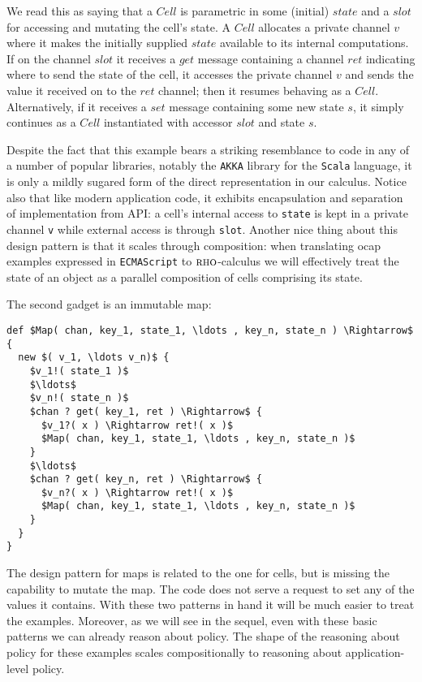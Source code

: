 \documentclass[]{acm_proc_article-sp}
\numberwithin{equation}{subsection}
\newcommand{\rhoc}{${\textsc{rho}}$-calculus}
\begin{document}
We read this as saying that a $Cell$ is parametric in some (initial)
$state$ and a $slot$ for accessing and mutating the cell's state. A
$Cell$ allocates a private channel $v$ where it makes the initially
supplied $state$ available to its internal computations. If on the
channel $slot$ it receives a $get$ message containing a channel $ret$
indicating where to send the state of the cell, it accesses the
private channel $v$ and sends the value it received on to the $ret$
channel; then it resumes behaving as a $Cell$. Alternatively, if it
receives a $set$ message containing some new state $s$, it simply
continues as a $Cell$ instantiated with accessor $slot$ and state $s$.

Despite the fact that this example bears a striking resemblance to code
in any of a number of popular libraries, notably the {\tt AKKA}
library for the {\tt Scala} language, it is only a mildly sugared
form of the direct representation in our calculus. Notice also that
like modern application code, it exhibits encapsulation and separation
of implementation from API: a cell's internal access to
{\tt state} is kept in a private channel {\tt v} while
external access is through {\tt slot}. Another nice thing about
this design pattern is that it scales through composition: when
translating ocap examples expressed in {\tt ECMAScript} to \rhoc\;
we will effectively treat the state of an object as a parallel
composition of cells comprising its state.

The second gadget is an immutable map:

\begin{lstlisting}[mathescape]
def $Map( chan, key_1, state_1, \ldots , key_n, state_n ) \Rightarrow$ {
  new $( v_1, \ldots v_n)$ {
    $v_1!( state_1 )$
    $\ldots$
    $v_n!( state_n )$
    $chan ? get( key_1, ret ) \Rightarrow$ { 
      $v_1?( x ) \Rightarrow ret!( x )$
      $Map( chan, key_1, state_1, \ldots , key_n, state_n )$
    }
    $\ldots$
    $chan ? get( key_n, ret ) \Rightarrow$ { 
      $v_n?( x ) \Rightarrow ret!( x )$
      $Map( chan, key_1, state_1, \ldots , key_n, state_n )$
    }
  }
}
\end{lstlisting}

The design pattern for maps is related to the one for cells, but is
missing the capability to mutate the map. The code does not serve a
request to set any of the values it contains. With these two patterns
in hand it will be much easier to treat the examples. Moreover, as we
will see in the sequel, even with these basic patterns we can already
reason about policy.  The shape of the reasoning about policy for these
examples scales compositionally to reasoning about application-level
policy.
\end{document}
